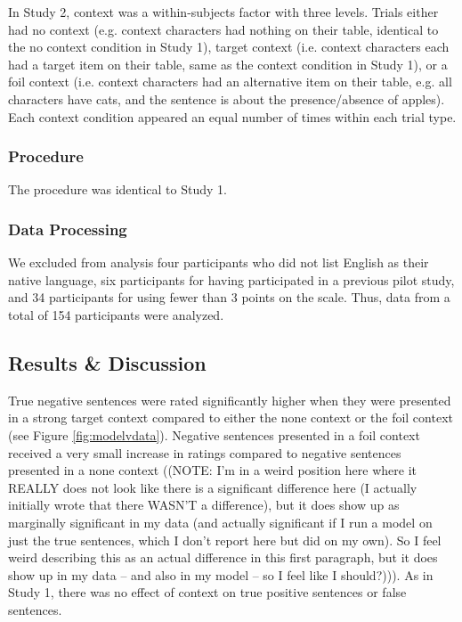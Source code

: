\documentclass[10pt,letterpaper]{article}
\begin{document}
In Study 2, context was a within-subjects factor with three levels.  Trials either had no context (e.g. context characters had nothing on their table, identical to the no context condition in Study 1), target context (i.e. context characters each had a target item on their table, same as the context condition in Study 1), or a foil context (i.e. context characters had an alternative item on their table, e.g. all characters have cats, and the sentence is about the presence/absence of apples).  Each context condition appeared an equal number of times within each trial type.  

\subsubsection{Procedure}
The procedure was identical to Study 1.

\subsubsection{Data Processing}
We excluded from analysis four participants who did not list English as their native language, six participants for having participated in a previous pilot study, and 34 participants for using fewer than 3 points on the scale.  Thus, data from a total of 154 participants were analyzed.  

\subsection{Results \& Discussion}
True negative sentences were rated significantly higher when they were presented in a strong target context compared to either the none context or the foil context (see Figure \ref{fig:modelvdata}).  Negative sentences presented in a foil context received a very small increase in ratings compared to negative sentences presented in a none context ((NOTE: I'm in a weird position here where it REALLY does not look like there is a significant difference here (I actually initially wrote that there WASN'T a difference), but it does show up as marginally significant in my data (and actually significant if I run a model on just the true sentences, which I don't report here but did on my own).  So I feel weird describing this as an actual difference in this first paragraph, but it does show up in my data -- and also in my model -- so I feel like I should?))).  As in Study 1, there was no effect of context on true positive sentences or false sentences.  
\end{document}
